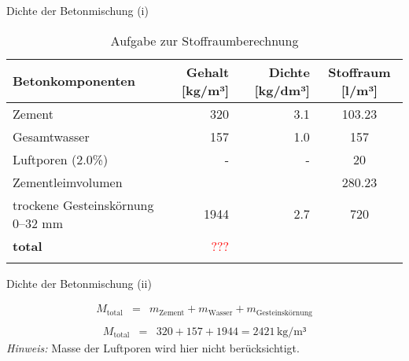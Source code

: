 \begin{frame}{Dichte der Betonmischung (i)}
    \begin{table}[h]
        \centering
        \caption{Aufgabe zur Stoffraumberechnung}
        \small
        \begin{tabular}{lrrc}
        \toprule
        \textbf{Betonkomponenten}       & \textbf{Gehalt [kg/m³]} & \textbf{Dichte [kg/dm³]} & \textbf{Stoffraum [l/m³]} \\ 
        \midrule
        Zement                           & 320                      & 3.1                       &    103.23          \\
        Gesamtwasser                     & 157                      & 1.0                       &  157            \\
        Luftporen (2.0\%)                & -                        & -                         & 20              \\
        Zementleimvolumen                &                          &                           & 280.23                          \\
        trockene Gesteinskörnung 0–32 mm & 1944                     & 2.7                       & 720              \\
        \textbf{total}                   & \textcolor{red}{???}         &                           & {}             \\
        \bottomrule
        \label{tab:Stoffraumberechnung}
        \end{tabular}
        \end{table}

\end{frame}

\begin{frame}{Dichte der Betonmischung (ii)}

    \begin{eqnarray*}
        M_{\text{total}} &=& m_{\text{Zement}} + m_{\text{Wasser}} + m_{\text{Gesteinskörnung}} \\
    \end{eqnarray*}
    \pause
    \begin{eqnarray*}
        M_{\text{total}} &=& 320 + 157 + 1944 = 2421 \, \text{kg/m³}
    \end{eqnarray*}
    \pause
    \textit{Hinweis:} Masse der Luftporen wird hier nicht berücksichtigt.


\end{frame}

